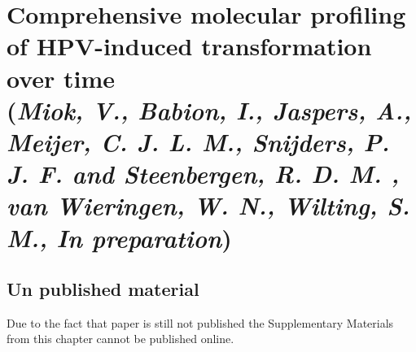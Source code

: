 \chapter{Comprehensive molecular profiling of HPV-induced transformation over time \\{\footnotesize(\textit{Miok, V., Babion, I., Jaspers, A., Meijer, C. J. L. M., Snijders, P. J. F. and Steenbergen, R. D. M. , van Wieringen, W. N., Wilting, S. M., In preparation})}}
\label{chapter:Window estimator}

\graphicspath{{Chapter5/Figs/}{Chapter5/Figs/PDF/}{Chapter5/Figs/}}%

\section{Un published material}
Due to the fact that paper is still not published the Supplementary Materials from this chapter cannot be published online.